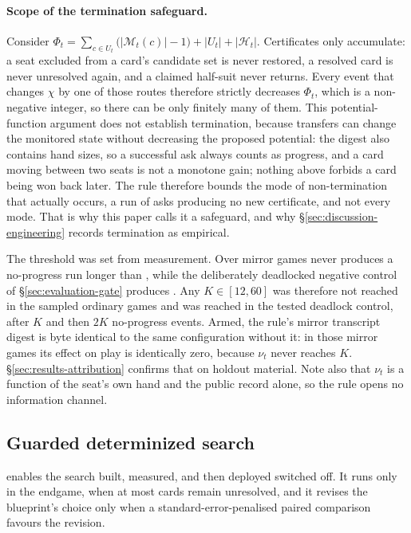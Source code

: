 \paragraph{Scope of the termination safeguard.} Consider
$\Phi_t = \sum_{c \in U_t}\bigl(|\mathcal{M}_t(c)| - 1\bigr) + |U_t| + |\mathcal{H}_t|$. Certificates
only accumulate: a seat excluded from a card's candidate set is never restored, a resolved card is
never unresolved again, and a claimed half-suit never returns. Every event that changes $\chi$ by one
of those routes therefore strictly decreases $\Phi_t$, which is a non-negative integer, so there can be
only finitely many of them. This potential-function argument does not establish termination,
because transfers can change the monitored state without decreasing the proposed potential: the
digest also contains hand sizes, so a successful ask always counts as progress, and a card moving
between two seats is not a monotone gain; nothing above forbids a card being won back later. The rule therefore bounds the mode
of non-termination that actually occurs, a run of asks producing no new certificate, and not every
mode. That is why this paper calls it a safeguard, and why \S\ref{sec:discussion-engineering} records
termination as empirical.

The threshold was set from measurement. Over \vsevenStallMirrorGames{} mirror games \vsix{} never
produces a no-progress run longer than \vsevenStallIncumbentRun{}, while the deliberately deadlocked
negative control of \S\ref{sec:evaluation-gate} produces \vsevenStallFrozenRun{}. Any
$K \in [12,60]$ was therefore not reached in the sampled ordinary games and was reached in the
tested deadlock control, after $K$ and then $2K$ no-progress events. Armed, the rule's mirror
transcript digest is byte identical to the same configuration without it: in those mirror games its
effect on play is identically zero, because $\nu_t$ never reaches $K$.
\S\ref{sec:results-attribution} confirms that on holdout material. Note also that $\nu_t$ is a
function of the seat's own hand and the public record alone, so the rule opens no information
channel.

\subsection{Guarded determinized search}
\label{sec:agent-search}

\sestina{} enables the search \vsix{} built, measured, and then deployed switched off. It runs only
in the endgame, when at most \texttt{\vsevenOptMaxq{}} cards remain unresolved, and it revises the
blueprint's choice only when a standard-error-penalised paired comparison favours the revision.


